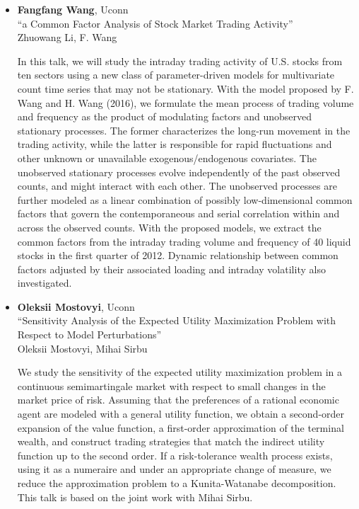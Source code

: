 \begin{itemize}
\item \textbf{Fangfang Wang}, Uconn \\
``a Common Factor Analysis of Stock Market Trading Activity'' \\
Zhuowang Li, F. Wang


In this talk, we will study the intraday trading activity of U.S. stocks from ten sectors using a new class of parameter-driven models for multivariate count time series that may not be stationary. With the  model proposed by F. Wang and H. Wang (2016), we formulate the mean process of trading volume and frequency as the product of modulating factors and unobserved stationary processes. The former characterizes the long-run movement in the trading activity, while the latter is responsible for rapid fluctuations and other unknown or unavailable exogenous/endogenous covariates. The unobserved stationary processes evolve independently of the past observed counts, and might interact with each other. The unobserved processes are further modeled as a linear combination of possibly low-dimensional common factors that govern the contemporaneous and serial correlation within and across the observed counts. With the proposed models, we extract the common factors from the intraday trading volume and  frequency of 40 liquid stocks in the first quarter of 2012. Dynamic relationship between common factors adjusted by their associated loading and intraday volatility also investigated.   

\item \textbf{Oleksii Mostovyi}, Uconn \\
``Sensitivity Analysis of the Expected Utility Maximization Problem with Respect to Model Perturbations'' \\
Oleksii Mostovyi, Mihai Sirbu


We study the sensitivity of the expected utility maximization problem in a continuous semimartingale market with respect to small changes in the market price of risk. Assuming that the preferences of a rational economic agent are modeled with a general utility function, we obtain a second-order expansion of the value function, a first-order approximation of the terminal wealth, and construct trading strategies that match the indirect utility function up to the second order. If a risk-tolerance wealth process exists, using it as a numeraire and under an appropriate change of measure, we reduce the approximation problem to a Kunita-Watanabe decomposition. This talk is based on the joint work with Mihai Sirbu. 

\end{itemize}

